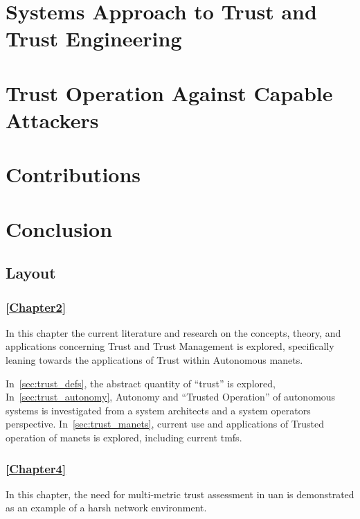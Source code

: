 \section{Systems Approach to Trust and Trust Engineering}


\section{Trust Operation Against Capable Attackers}


\section{Contributions}


\section{Conclusion}


\subsection{Layout}

\subsubsection{\autoref{Chapter2}}
In this chapter the current literature and research on the concepts, theory, and applications concerning Trust and Trust Management is explored, specifically leaning towards the applications of Trust within Autonomous \glspl{manet}.

In~\autoref{sec:trust_defs}, the abstract quantity of ``trust'' is explored,
In~\autoref{sec:trust_autonomy}, Autonomy and ``Trusted Operation'' of autonomous systems is investigated from a system architects and a system operators perspective.
In~\autoref{sec:trust_manets}, current use and applications of Trusted operation of \glspl{manet} is explored, including current \glspl{tmf}.

\subsubsection{\autoref{Chapter4}}
In this chapter, the need for multi-metric trust assessment in \gls{uan} is demonstrated as an example of a harsh network environment.

